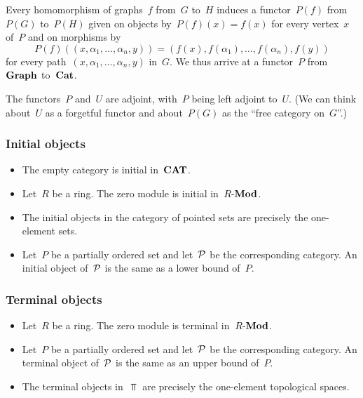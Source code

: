 \begin{itemize}
		Every homomorphism of graphs~$f$ from~$G$ to~$H$ induces a functor~$P(f)$ from~$P(G)$ to~$P(H)$ given on objects by~$P(f)(x) = f(x)$ for every vertex~$x$ of~$P$ and on morphisms by
		\[
			P(f)( (x, α_1, \dotsc, α_n, y) )
			=
			( f(x), f(α_1), \dotsc, f(α_n), f(y) )
		\]
		for every path~$(x, α_1, \dotsc, α_n, y)$ in~$G$.
		We thus arrive at a functor~$P$ from~$\mathbf{Graph}$ to~$\mathbf{Cat}$.

		The functors~$P$ and~$U$ are adjoint, with~$P$ being left adjoint to~$U$.
		(We can think about~$U$ as a forgetful functor and about~$P(G)$ as the \enquote{free category on~$G$}.)
\end{itemize}





\subsubsection*{Initial objects}

\begin{itemize}
	\item
		The empty category is initial in~$\mathbf{CAT}$.
	\item
		Let~$R$ be a ring.
		The zero module is initial in~$R\text{-}\mathbf{Mod}$.
	\item
		The initial objects in the category of pointed sets are precisely the one-element sets.
	\item
		Let~$P$ be a partially ordered set and let~$\mathcal{P}$ be the corresponding category.
		An initial object of~$\mathcal{P}$ is the same as a lower bound of~$P$.
\end{itemize}





\subsubsection*{Terminal objects}

\begin{itemize}
	\item
		Let~$R$ be a ring.
		The zero module is terminal in~$R\text{-}\mathbf{Mod}$.
	\item
		Let~$P$ be a partially ordered set and let~$\mathcal{P}$ be the corresponding category.
		An terminal object of~$\mathcal{P}$ is the same as an upper bound of~$P$.
	\item
		The terminal objects in~$\Top$ are precisely the one-element topological spaces.
\end{itemize}





